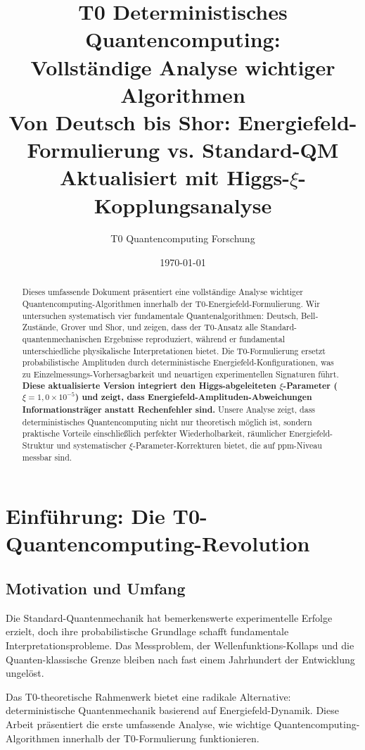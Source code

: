 \documentclass[12pt,a4paper]{article}
\title{T0 Deterministisches Quantencomputing: \\
	Vollständige Analyse wichtiger Algorithmen \\
	\large Von Deutsch bis Shor: Energiefeld-Formulierung vs. Standard-QM \\
	\textbf{Aktualisiert mit Higgs-$\xi$-Kopplungsanalyse}}
\author{T0 Quantencomputing Forschung}
\date{\today}
\begin{document}
	
	\maketitle
	
	\begin{abstract}
		Dieses umfassende Dokument präsentiert eine vollständige Analyse wichtiger \\Quantencomputing-Algorithmen innerhalb der T0-Energiefeld-Formulierung. Wir untersuchen systematisch vier fundamentale Quantenalgorithmen: Deutsch, Bell-Zustände, Grover und Shor, und zeigen, dass der T0-Ansatz alle Standard-quantenmechanischen Ergebnisse reproduziert, während er fundamental unterschiedliche physikalische Interpretationen bietet. Die T0-Formulierung ersetzt probabilistische Amplituden durch deterministische Energiefeld-Konfigurationen, was zu Einzelmessungs-Vorhersagbarkeit und neuartigen experimentellen Signaturen führt. \textbf{Diese aktualisierte Version integriert den Higgs-abgeleiteten $\xi$-Parameter ($\xi = 1,0 \times 10^{-5}$) und zeigt, dass Energiefeld-Amplituden-Abweichungen Informationsträger anstatt Rechenfehler sind.} Unsere Analyse zeigt, dass deterministisches Quantencomputing nicht nur theoretisch möglich ist, sondern praktische Vorteile einschließlich perfekter Wiederholbarkeit, räumlicher Energiefeld-Struktur und systematischer $\xi$-Parameter-Korrekturen bietet, die auf ppm-Niveau messbar sind.
	\end{abstract}
	
	\tableofcontents
	\newpage
	
	\section{Einführung: Die T0-Quantencomputing-Revolution}
	
	\subsection{Motivation und Umfang}
	
	Die Standard-Quantenmechanik hat bemerkenswerte experimentelle Erfolge erzielt, doch ihre probabilistische Grundlage schafft fundamentale Interpretationsprobleme. Das Messproblem, der Wellenfunktions-Kollaps und die Quanten-klassische Grenze bleiben nach fast einem Jahrhundert der Entwicklung ungelöst.
	
	Das T0-theoretische Rahmenwerk bietet eine radikale Alternative: deterministische Quantenmechanik basierend auf Energiefeld-Dynamik. Diese Arbeit präsentiert die erste umfassende Analyse, wie wichtige Quantencomputing-Algorithmen innerhalb der T0-Formulierung funktionieren.
	
\end{document}
